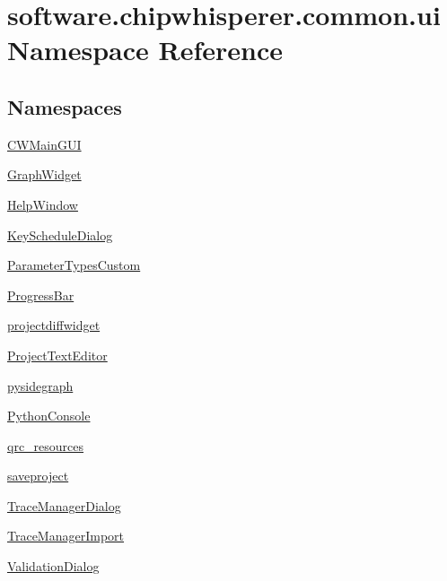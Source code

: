\hypertarget{namespacesoftware_1_1chipwhisperer_1_1common_1_1ui}{}\section{software.\+chipwhisperer.\+common.\+ui Namespace Reference}
\label{namespacesoftware_1_1chipwhisperer_1_1common_1_1ui}
\subsection*{Namespaces}
\begin{DoxyCompactItemize}
\item 
 \hyperlink{namespacesoftware_1_1chipwhisperer_1_1common_1_1ui_1_1CWMainGUI}{C\+W\+Main\+G\+U\+I}
\item 
 \hyperlink{namespacesoftware_1_1chipwhisperer_1_1common_1_1ui_1_1GraphWidget}{Graph\+Widget}
\item 
 \hyperlink{namespacesoftware_1_1chipwhisperer_1_1common_1_1ui_1_1HelpWindow}{Help\+Window}
\item 
 \hyperlink{namespacesoftware_1_1chipwhisperer_1_1common_1_1ui_1_1KeyScheduleDialog}{Key\+Schedule\+Dialog}
\item 
 \hyperlink{namespacesoftware_1_1chipwhisperer_1_1common_1_1ui_1_1ParameterTypesCustom}{Parameter\+Types\+Custom}
\item 
 \hyperlink{namespacesoftware_1_1chipwhisperer_1_1common_1_1ui_1_1ProgressBar}{Progress\+Bar}
\item 
 \hyperlink{namespacesoftware_1_1chipwhisperer_1_1common_1_1ui_1_1projectdiffwidget}{projectdiffwidget}
\item 
 \hyperlink{namespacesoftware_1_1chipwhisperer_1_1common_1_1ui_1_1ProjectTextEditor}{Project\+Text\+Editor}
\item 
 \hyperlink{namespacesoftware_1_1chipwhisperer_1_1common_1_1ui_1_1pysidegraph}{pysidegraph}
\item 
 \hyperlink{namespacesoftware_1_1chipwhisperer_1_1common_1_1ui_1_1PythonConsole}{Python\+Console}
\item 
 \hyperlink{namespacesoftware_1_1chipwhisperer_1_1common_1_1ui_1_1qrc__resources}{qrc\+\_\+resources}
\item 
 \hyperlink{namespacesoftware_1_1chipwhisperer_1_1common_1_1ui_1_1saveproject}{saveproject}
\item 
 \hyperlink{namespacesoftware_1_1chipwhisperer_1_1common_1_1ui_1_1TraceManagerDialog}{Trace\+Manager\+Dialog}
\item 
 \hyperlink{namespacesoftware_1_1chipwhisperer_1_1common_1_1ui_1_1TraceManagerImport}{Trace\+Manager\+Import}
\item 
 \hyperlink{namespacesoftware_1_1chipwhisperer_1_1common_1_1ui_1_1ValidationDialog}{Validation\+Dialog}
\end{DoxyCompactItemize}
